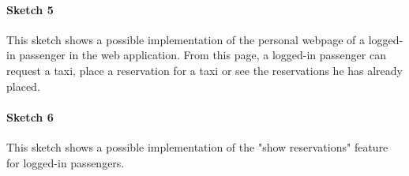\paragraph{Sketch 5}
This sketch shows a possible implementation of the personal webpage of a logged-in passenger in the web application. From this page, a logged-in passenger can request a taxi, place a reservation for a taxi or see the reservations he has already placed.
\begin{figure}[H]
\centering
{}
\end{figure}


\paragraph{Sketch 6}
This sketch shows a possible implementation of the "show reservations" feature for logged-in passengers.
\begin{figure}[H]
\centering
{}
\end{figure}


